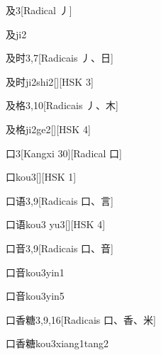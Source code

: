 \begin{entry}{及}{3}[Radical ⼃]
  \begin{phonetics}{及}{ji2}
  \end{phonetics}
\end{entry}

\begin{entry}{及时}{3,7}[Radicais ⼃、⽇]
  \begin{phonetics}{及时}{ji2shi2}[][HSK 3]
  \end{phonetics}
\end{entry}

\begin{entry}{及格}{3,10}[Radicais ⼃、⽊]
  \begin{phonetics}{及格}{ji2ge2}[][HSK 4]
  \end{phonetics}
\end{entry}

\begin{entry}{口}{3}[Kangxi 30][Radical ⼝]
  \begin{phonetics}{口}{kou3}[][HSK 1]
  \end{phonetics}
\end{entry}

\begin{entry}{口语}{3,9}[Radicais ⼝、⾔]
  \begin{phonetics}{口语}{kou3 yu3}[][HSK 4]
  \end{phonetics}
\end{entry}

\begin{entry}{口音}{3,9}[Radicais ⼝、⾳]
  \begin{phonetics}{口音}{kou3yin1}
  \end{phonetics}
  \begin{phonetics}{口音}{kou3yin5}
  \end{phonetics}
\end{entry}

\begin{entry}{口香糖}{3,9,16}[Radicais ⼝、⾹、⽶]
  \begin{phonetics}{口香糖}{kou3xiang1tang2}
  \end{phonetics}
\end{entry}

